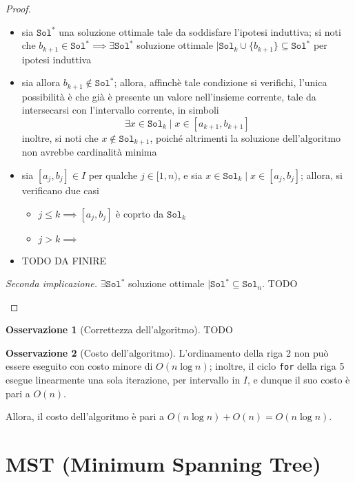 \documentclass[14pt]{extreport}
\theoremstyle{definition}
\theoremstyle{definition}
\newtheorem{remark}{Osservazione}[subsection]
\begin{document}
\begin{proof}
\begin{itemize}
\begin{itemize}
                \item sia $\texttt{Sol}^*$ una soluzione ottimale tale da soddisfare l'ipotesi induttiva; si noti che $b_{k +1} \in \texttt{Sol}^* \implies \exists \texttt{Sol}^*$ soluzione ottimale $\mid \texttt{Sol}_k \cup \{ b_{k +1}\} \subseteq \texttt{Sol}^*$ per ipotesi induttiva
                \item sia allora $b_{k +1} \notin \texttt{Sol}^*$; allora, affinchè tale condizione si verifichi, l'unica possibilità è che già è presente un valore nell'insieme corrente, tale da intersecarsi con l'intervallo corrente, in simboli $$\exists x \in \texttt{Sol}_k \mid x \in [a_{k + 1}, b_{k +1}]$$ inoltre, si noti che $x \notin \texttt{Sol}_{k + 1}$, poiché altrimenti la soluzione dell'algoritmo non avrebbe cardinalità minima
                \item sia $[a_j, b_j] \in I$ per qualche $j \in [1, n)$, e sia $x \in \texttt{Sol}_k \mid x \in [a_j, b_j]$; allora, si verificano due casi
                    \begin{itemize}
                        \item $j \le k \implies [a_j, b_j]$ è coprto da $\texttt{Sol}_k$
                        \item $j > k \implies$
                    \end{itemize}
                \item TODO DA FINIRE
            \end{itemize}
        \textit{Seconda implicazione.} $\exists \texttt{Sol}^*$ soluzione ottimale $\mid \texttt{Sol}^* \subseteq \texttt{Sol}_n$. TODO
    \end{itemize}
\end{proof}

\begin{remark}[Correttezza dell'algoritmo]
    TODO
\end{remark}

\begin{remark}[Costo dell'algoritmo]
    L'ordinamento della riga 2 non può essere eseguito con costo minore di $O(n \log n)$; inoltre, il ciclo \texttt{for} della riga 5 esegue linearmente una sola iterazione, per intervallo in $I$, e dunque il suo costo è pari a $O(n)$.

    Allora, il costo dell'algoritmo è pari a $O(n \log n) + O(n) = O(n \log n)$.
\end{remark}

\section{MST (Minimum Spanning Tree)}
\end{document}
